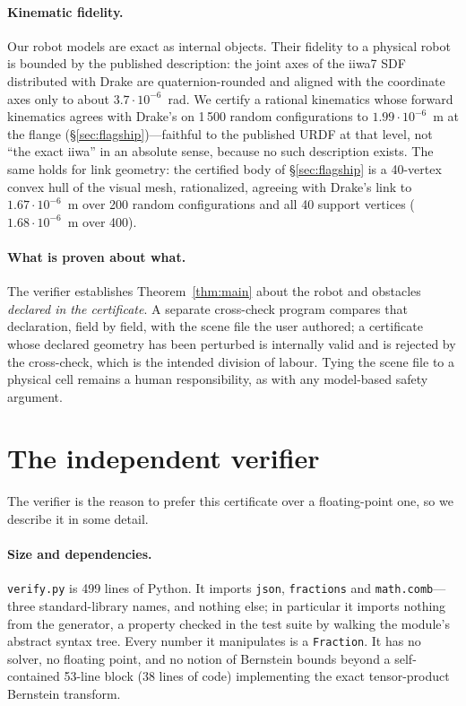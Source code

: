 \documentclass[10pt,twocolumn,letterpaper]{article}
\begin{document}
\paragraph{Kinematic fidelity.} Our robot models are exact as internal objects. Their fidelity to a physical robot is bounded by the published description: the joint axes of the iiwa7 SDF distributed with Drake are quaternion-rounded and aligned with the coordinate axes only to about $3.7\cdot10^{-6}$~rad. We certify a rational kinematics whose forward kinematics agrees with Drake's on 1\,500 random configurations to $1.99\cdot10^{-6}$~m at the flange (\S\ref{sec:flagship})---faithful to the published URDF at that level, not ``the exact iiwa'' in an absolute sense, because no such description exists. The same holds for link geometry: the certified body of \S\ref{sec:flagship} is a 40-vertex convex hull of the visual mesh, rationalized, agreeing with Drake's link to $1.67\cdot10^{-6}$~m over 200 random configurations and all 40 support vertices ($1.68\cdot10^{-6}$~m over 400).

\paragraph{What is proven about what.} The verifier establishes Theorem~\ref{thm:main} about the robot and obstacles \emph{declared in the certificate}. A separate cross-check program compares that declaration, field by field, with the scene file the user authored; a certificate whose declared geometry has been perturbed is internally valid and is rejected by the cross-check, which is the intended division of labour. Tying the scene file to a physical cell remains a human responsibility, as with any model-based safety argument.

\section{The independent verifier}\label{sec:verifier}

The verifier is the reason to prefer this certificate over a floating-point one, so we describe it in some detail.

\paragraph{Size and dependencies.} \texttt{verify.py} is 499 lines of Python. It imports \texttt{json}, \texttt{fractions} and \texttt{math.comb}---three standard-library names, and nothing else; in particular it imports nothing from the generator, a property checked in the test suite by walking the module's abstract syntax tree. Every number it manipulates is a \texttt{Fraction}. It has no solver, no floating point, and no notion of Bernstein bounds beyond a self-contained 53-line block (38 lines of code) implementing the exact tensor-product Bernstein transform.
\end{document}
